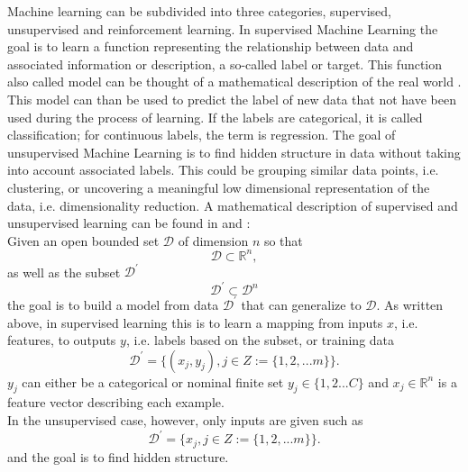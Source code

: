 Machine learning can be subdivided into three categories, supervised, unsupervised and reinforcement learning. In supervised Machine Learning the goal is to learn a function representing the relationship between data and associated information or description, a so-called label or target.  This function also called model can be thought of a mathematical description of the real world \cite{Brunton2019}. This model can than be used to predict the label of new data that not have been used during the process of learning. If the labels are categorical, it is called classification; for continuous labels, the term is regression. The goal of unsupervised Machine Learning is to find hidden structure in data without taking into account associated labels. This could be grouping similar data points, i.e. clustering, or uncovering a meaningful low dimensional representation of the data, i.e. dimensionality reduction. A mathematical description of supervised and unsupervised learning can be found in \cite{Brunton_kutz_2019} and \cite{Murphy2012}:\\
Given an open bounded set \(\mathcal{D}\) of dimension \(n\) so that
\begin{equation}
\mathcal{D}\subset\mathbb{R}^{n},
\end{equation}
as well as the subset \(\mathcal{D}^{'}\) 
\begin{equation}
    \mathcal{D}^{'}\subset\mathcal{D}^{n}
\end{equation}
the goal is to build a model from data \(\mathcal{D}^{'}\) that can generalize to \(\mathcal{D}\). As written above, in supervised learning this is to learn a mapping from inputs \(x\), i.e. features, to outputs \(y\), i.e. labels based on the subset, or training data
\begin{equation}
    \mathcal{D}^{'}=\{(x_j, y_j), j \in Z := \{1,2,...m\}\}. 
\end{equation}
\(y_j\) can either be a categorical or nominal finite set \(y_j \in \{1,2...C\}\) and \(x_j \in \mathbb R^{n}\) is a feature vector describing each example.\\
In the unsupervised case, however, only inputs are given such as 
\begin{equation}
    \mathcal{D}^{'}=\{x_j, j \in Z := \{1,2,...m\}\}. 
\end{equation}
and the goal is to find hidden structure. 











